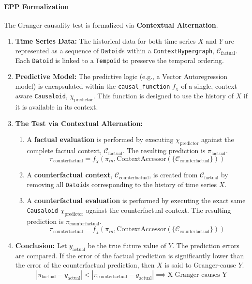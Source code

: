 \paragraph{EPP Formalization}
The Granger causality test is formalized via \textbf{Contextual Alternation}.
\begin{enumerate}
    \item \textbf{Time Series Data:} The historical data for both time series \(X\) and \(Y\) are represented as a sequence of \texttt{Datoid}s within a \texttt{ContextHypergraph}, \(\mathcal{C}_{\text{factual}}\). Each \texttt{Datoid} is linked to a \texttt{Tempoid} to preserve the temporal ordering.

    \item \textbf{Predictive Model:} The predictive logic (e.g., a Vector Autoregression model) is encapsulated within the \texttt{causal\_function} \(f_{\chi}\) of a single, context-aware \texttt{Causaloid}, \(\chi_{\text{predictor}}\). This function is designed to use the history of \(X\) if it is available in its context.

    \item \textbf{The Test via Contextual Alternation:}
    \begin{enumerate}
        \item A \textbf{factual evaluation} is performed by executing \(\chi_{\text{predictor}}\) against the complete factual context, \(\mathcal{C}_{\text{factual}}\). The resulting prediction is \(\pi_{\text{factual}}\).
        \[ 
         \pi_{\text{counterfactual}} = f_{\chi}(\pi_{in}, \text{ContextAccessor}(\{\mathcal{C}_{\text{counterfactual}}\}))
        \]
        \item A \textbf{counterfactual context}, \(\mathcal{C}_{\text{counterfactual}}\), is created from \(\mathcal{C}_{\text{factual}}\) by removing all \texttt{Datoid}s corresponding to the history of time series \(X\).
        \item A \textbf{counterfactual evaluation} is performed by executing the exact same \texttt{Causaloid} \(\chi_{\text{predictor}}\) against the counterfactual context. The resulting prediction is \(\pi_{\text{counterfactual}}\).
         \[ 
          \pi_{\text{counterfactual}} = f_{\chi}(\pi_{in}, \text{ContextAccessor}(\{\mathcal{C}_{\text{counterfactual}}\}))
         \]
    \end{enumerate}
    \item \textbf{Conclusion:} Let \(y_{\text{actual}}\) be the true future value of \(Y\). The prediction errors are compared. If the error of the factual prediction is significantly lower than the error of the counterfactual prediction, then \(X\) is said to Granger-cause \(Y\).
    \[ 
    |\pi_{\text{factual}} - y_{\text{actual}}| < |\pi_{\text{counterfactual}} - y_{\text{actual}}| \implies \text{X Granger-causes Y}
    \]
\end{enumerate}


